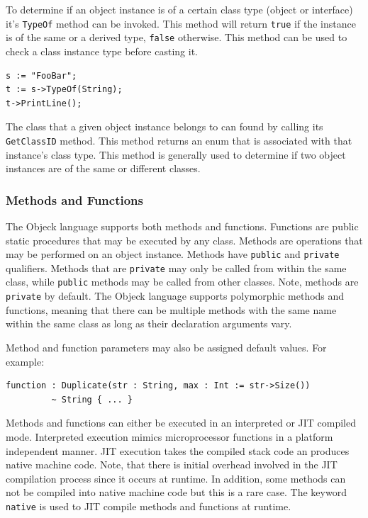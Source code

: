 \documentclass[11pt]{article}
\begin{document}
To determine if an object instance is of a certain class type (object
or interface) it's \texttt{TypeOf} method can be invoked.  This method
will return \texttt{true} if the instance is of the same or a derived
type, \texttt{false} otherwise.  This method can be used to check a
class instance type before casting it.

\begin{verbatim}
s := "FooBar";
t := s->TypeOf(String);
t->PrintLine();
\end{verbatim}

The class that a given object instance belongs to can found by calling
its \texttt{GetClassID} method.  This method returns an enum that is
associated with that instance's class type.  This method is generally
used to determine if two object instances are of the same or different
classes.

\subsubsection{Methods and Functions}
The Objeck language supports both methods and functions.  Functions
are public static procedures that may be executed by any class.
Methods are operations that may be performed on an object instance.
Methods have \texttt{public} and \texttt{private} qualifiers.  Methods
that are \texttt{private} may only be called from within the same
class, while \texttt{public} methods may be called from other classes.
Note, methods are \texttt{private} by default. The Objeck language
supports polymorphic methods and functions, meaning that there can be
multiple methods with the same name within the same class as long as
their declaration arguments vary.

Method and function parameters may also be assigned default values.  For example:
\begin{verbatim}
function : Duplicate(str : String, max : Int := str->Size()) 
         ~ String { ... }
\end{verbatim}

Methods and functions can either be executed in an interpreted or JIT
compiled mode. Interpreted execution mimics microprocessor functions
in a platform independent manner. JIT execution takes the compiled
stack code an produces native machine code. Note, that there is
initial overhead involved in the JIT compilation process since it
occurs at runtime. In addition, some methods can not be compiled into
native machine code but this is a rare case.  The keyword
\texttt{native} is used to JIT compile methods and functions at
runtime.
\end{document}
